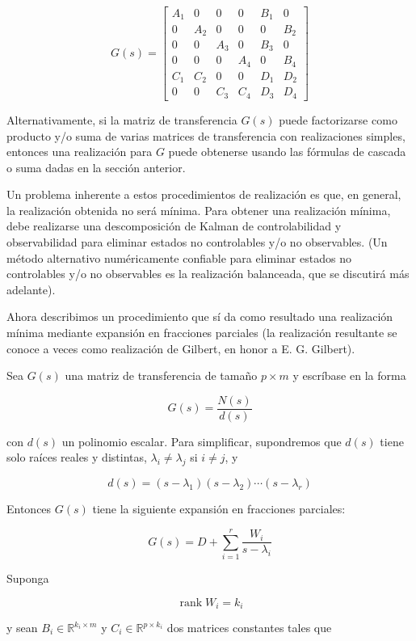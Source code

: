 \documentclass[11pt]{article}
\begin{document}
$$
G(s)=\left[\begin{array}{cccc|cc}
A_{1} & 0 & 0 & 0 & B_{1} & 0 \\
0 & A_{2} & 0 & 0 & 0 & B_{2} \\
0 & 0 & A_{3} & 0 & B_{3} & 0 \\
0 & 0 & 0 & A_{4} & 0 & B_{4} \\
\hline C_{1} & C_{2} & 0 & 0 & D_{1} & D_{2} \\
0 & 0 & C_{3} & C_{4} & D_{3} & D_{4}
\end{array}\right]
$$

Alternativamente, si la matriz de transferencia $G(s)$ puede factorizarse como producto y/o suma de varias matrices de transferencia con realizaciones simples, entonces una realización para $G$ puede obtenerse usando las fórmulas de cascada o suma dadas en la sección anterior.

Un problema inherente a estos procedimientos de realización es que, en general, la realización obtenida no será mínima. Para obtener una realización mínima, debe realizarse una descomposición de Kalman de controlabilidad y observabilidad para eliminar estados no controlables y/o no observables. (Un método alternativo numéricamente confiable para eliminar estados no controlables y/o no observables es la realización balanceada, que se discutirá más adelante).

Ahora describimos un procedimiento que sí da como resultado una realización mínima mediante expansión en fracciones parciales (la realización resultante se conoce a veces como realización de Gilbert, en honor a E. G. Gilbert).

Sea $G(s)$ una matriz de transferencia de tamaño $p \times m$ y escríbase en la forma

$$
G(s)=\frac{N(s)}{d(s)}
$$

con $d(s)$ un polinomio escalar. Para simplificar, supondremos que $d(s)$ tiene solo raíces reales y distintas, $\lambda_{i} \neq \lambda_{j}$ si $i \neq j$, y

$$
d(s)=\left(s-\lambda_{1}\right)\left(s-\lambda_{2}\right) \cdots\left(s-\lambda_{r}\right)
$$

Entonces $G(s)$ tiene la siguiente expansión en fracciones parciales:

$$
G(s)=D+\sum_{i=1}^{r} \frac{W_{i}}{s-\lambda_{i}}
$$

Suponga

$$
\operatorname{rank} W_{i}=k_{i}
$$

y sean $B_{i} \in \mathbb{R}^{k_{i} \times m}$ y $C_{i} \in \mathbb{R}^{p \times k_{i}}$ dos matrices constantes tales que
\end{document}
